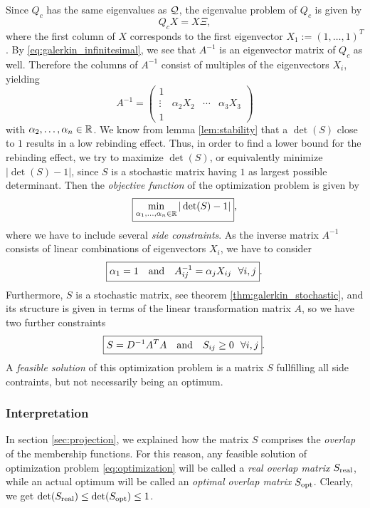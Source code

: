 Since $Q_c$ has the same eigenvalues as $\mathcal{Q}$, the eigenvalue problem of $Q_c$ is given by
\begin{equation}
\label{eq:eigenvalue_problem}
Q_c X = X \Xi,
\end{equation}
where the first column of $X$ corresponds to the first eigenvector $X_1 := (1,\dots, 1)^T$.
By \eqref{eq:galerkin_infinitesimal}, we see that $A^{-1}$ is an eigenvector matrix of $Q_c$ as well.
Therefore the columns of $A^{-1}$ consist of multiples of the eigenvectors $X_i$, yielding
\begin{equation*}
A^{-1} =
\begin{pmatrix}
1 	  & & & \\
\vdots & \alpha_2 X_2 & \cdots & \alpha_3 X_3 \\
1	  & & &
\end{pmatrix}
\end{equation*}
with $\alpha_2,\dots,\alpha_n \in \mathbb{R}$. We know from lemma \ref{lem:stability} that a $\det(S)$ close to $1$ results in a low rebinding effect. Thus, in order to find a lower bound for the rebinding effect, we try to maximize $\det(S)$, or equivalently minimize $|\det(S)-1|$, since $S$ is a stochastic matrix having $1$ as largest possible determinant.
Then the \textit{objective function} of the optimization problem is given by
\begin{equation}
\label{eq:optimization}
\mbox{
\boxed{ \min_{\alpha_1, \dots, \alpha_n \in \mathbb{R}} |\det(S) -1|},
}
\end{equation}
where we have to include several \textit{side constraints}. As the inverse matrix $A^{-1}$ consists of linear combinations of eigenvectors $X_i$, we have to consider
\begin{equation*}
\mbox{
\boxed{ \alpha_1 = 1 \ \ \ \mathrm{and} \ \ \ A_{ij}^{-1} = \alpha_j X_{ij} \ \ \forall i,j}.
}
\end{equation*}
Furthermore, $S$ is a stochastic matrix, see theorem \ref{thm:galerkin_stochastic}, and its structure is given in terms of the linear transformation matrix $A$, so we have two further constraints
\begin{equation*}
\mbox{
\boxed{S = D^{-1} A^TA \ \ \ \mathrm{and} \ \ \ S_{ij} \geq 0 \ \ \forall i,j}.
}
\end{equation*}
A \textit{feasible solution} of this optimization problem is a matrix $S$ fullfilling all side contraints, but not necessarily being an optimum.

\subsubsection*{Interpretation}
In section \ref{sec:projection}, we explained how the matrix $S$ comprises the \textit{overlap} of the membership functions.
For this reason, any feasible solution of optimization problem \eqref{eq:optimization} will be called a \textit{real overlap matrix} $S_{\mathrm{real}}$, while an actual optimum will be called an \textit{optimal overlap matrix} $S_{\mathrm{opt}}$. Clearly, we get $\det(S_{\mathrm{real}}) \leq \det(S_{\mathrm{opt}}) \leq 1$.

